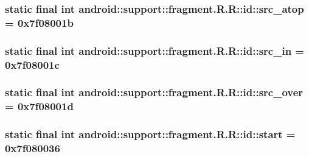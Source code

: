 \hypertarget{classandroid_1_1support_1_1fragment_1_1_r_1_1id_1d5498920fdc4cd7fdb970eb5703f5ef}{
\subsubsection[{src\_\-atop}]{\setlength{\rightskip}{0pt plus 5cm}static final int android::support::fragment.R.R::id::src\_\-atop = 0x7f08001b}}
\label{classandroid_1_1support_1_1fragment_1_1_r_1_1id_1d5498920fdc4cd7fdb970eb5703f5ef}


\hypertarget{classandroid_1_1support_1_1fragment_1_1_r_1_1id_843fb044bd4025105fda9ddf9d5c8e1e}{
\subsubsection[{src\_\-in}]{\setlength{\rightskip}{0pt plus 5cm}static final int android::support::fragment.R.R::id::src\_\-in = 0x7f08001c}}
\label{classandroid_1_1support_1_1fragment_1_1_r_1_1id_843fb044bd4025105fda9ddf9d5c8e1e}


\hypertarget{classandroid_1_1support_1_1fragment_1_1_r_1_1id_5a5bff2dbedaddca9b44126dd0c3bda2}{
\subsubsection[{src\_\-over}]{\setlength{\rightskip}{0pt plus 5cm}static final int android::support::fragment.R.R::id::src\_\-over = 0x7f08001d}}
\label{classandroid_1_1support_1_1fragment_1_1_r_1_1id_5a5bff2dbedaddca9b44126dd0c3bda2}


\hypertarget{classandroid_1_1support_1_1fragment_1_1_r_1_1id_1d9ef2b69119c9cab3d40e4245238384}{
\subsubsection[{start}]{\setlength{\rightskip}{0pt plus 5cm}static final int android::support::fragment.R.R::id::start = 0x7f080036}}
\label{classandroid_1_1support_1_1fragment_1_1_r_1_1id_1d9ef2b69119c9cab3d40e4245238384}


